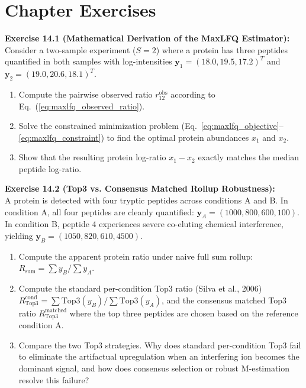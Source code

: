 \documentclass[11pt,oneside]{book}
\begin{document}
\section{Chapter Exercises}

\noindent\textbf{Exercise 14.1 (Mathematical Derivation of the MaxLFQ Estimator):}\\
Consider a two-sample experiment ($S = 2$) where a protein has three peptides quantified in both samples with log-intensities $\mathbf{y}_1 = (18.0, 19.5, 17.2)^T$ and $\mathbf{y}_2 = (19.0, 20.6, 18.1)^T$.
\begin{enumerate}
    \item Compute the pairwise observed ratio $r_{12}^{\text{obs}}$ according to Eq.~(\ref{eq:maxlfq_observed_ratio}).
    \item Solve the constrained minimization problem (Eq.~\ref{eq:maxlfq_objective}--\ref{eq:maxlfq_constraint}) to find the optimal protein abundances $x_1$ and $x_2$.
    \item Show that the resulting protein log-ratio $x_1 - x_2$ exactly matches the median peptide log-ratio.
\end{enumerate}

\vspace{0.8em}
\noindent\textbf{Exercise 14.2 (Top3 vs. Consensus Matched Rollup Robustness):}\\
A protein is detected with four tryptic peptides across conditions A and B. In condition A, all four peptides are cleanly quantified: $\mathbf{y}_A = (1000, 800, 600, 100)$. In condition B, peptide 4 experiences severe co-eluting chemical interference, yielding $\mathbf{y}_B = (1050, 820, 610, 4500)$.
\begin{enumerate}
    \item Compute the apparent protein ratio under naive full sum rollup: $R_{\text{sum}} = \sum y_B / \sum y_A$.
    \item Compute the standard per-condition Top3 ratio (Silva et al., 2006) $R_{\text{Top3}}^{\text{cond}} = \sum \text{Top3}(y_B) / \sum \text{Top3}(y_A)$, and the consensus matched Top3 ratio $R_{\text{Top3}}^{\text{matched}}$ where the top three peptides are chosen based on the reference condition A.
    \item Compare the two Top3 strategies. Why does standard per-condition Top3 fail to eliminate the artifactual upregulation when an interfering ion becomes the dominant signal, and how does consensus selection or robust M-estimation resolve this failure?
\end{enumerate}
\end{document}
